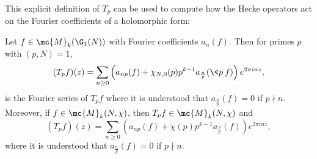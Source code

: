     This explicit definition of $T_{p}$ can be used to compute how the Hecke operators act on the Fourier coefficients of a holomorphic form:

    \begin{proposition}\label{prop:prime_Hecke_operators_acting_on_Fourier_coefficients_holomorphic}
      Let $f \in \mc{M}_{k}(\G_{1}(N))$ with Fourier coefficients $a_{n}(f)$. Then for primes $p$ with $(p,N) = 1$,
      \[
        (T_{p}f)(z) = \sum_{n \ge 0}\left(a_{np}(f)+\chi_{N,0}(p)p^{k-1}a_{\frac{n}{p}}(\<p\>f)\right)e^{2\pi inz},
      \]
      is the Fourier series of $T_{p}f$ where it is understood that $a_{\frac{n}{p}}(f) = 0$ if $p \nmid n$. Moreover, if $f \in \mc{M}_{k}(N,\chi)$, then $T_{p}f \in \mc{M}_{k}(N,\chi)$ and
      \[
        (T_{p}f)(z) = \sum_{n \ge 0}\left(a_{np}(f)+\chi(p)p^{k-1}a_{\frac{n}{p}}(f)\right)e^{2\pi inz},
      \]
      where it is understood that $a_{\frac{n}{p}}(f) = 0$ if $p \nmid n$.
    \end{proposition}
